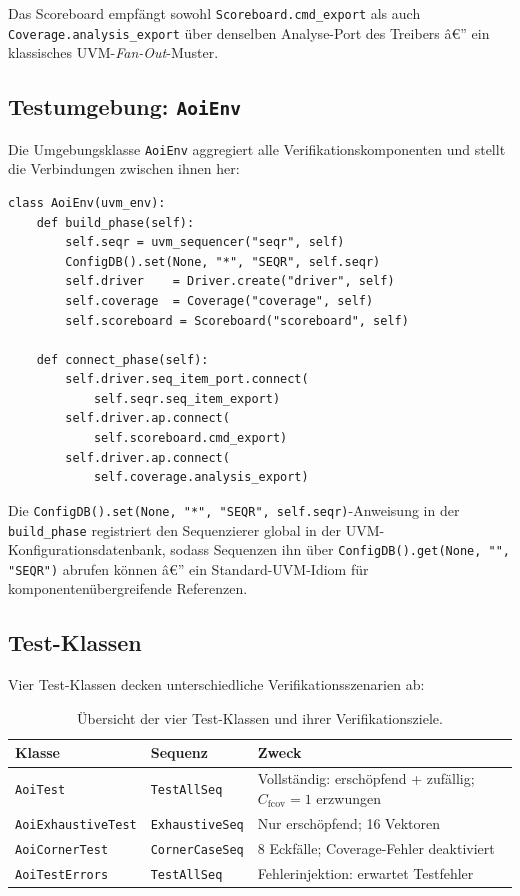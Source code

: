 ﻿\documentclass[12pt,a4paper]{report}
\begin{document}
Das Scoreboard empfängt sowohl \texttt{Scoreboard.cmd\_export} als auch
\texttt{Coverage.analy\newline sis\_export} über denselben Analyse-Port des Treibers â€”
ein klassisches UVM-\emph{Fan-Out}-Muster.

\subsection{Testumgebung: \texttt{AoiEnv}}
\label{sssec:aoi_env}

Die Umgebungsklasse \texttt{AoiEnv} aggregiert alle Verifikationskomponenten
und stellt die Verbindungen zwischen ihnen her:

\begin{lstlisting}[style=pythonstyle, caption={\texttt{AoiEnv}: Aufbau und Vernetzung}]
class AoiEnv(uvm_env):
    def build_phase(self):
        self.seqr = uvm_sequencer("seqr", self)
        ConfigDB().set(None, "*", "SEQR", self.seqr)
        self.driver    = Driver.create("driver", self)
        self.coverage  = Coverage("coverage", self)
        self.scoreboard = Scoreboard("scoreboard", self)

    def connect_phase(self):
        self.driver.seq_item_port.connect(
            self.seqr.seq_item_export)
        self.driver.ap.connect(
            self.scoreboard.cmd_export)
        self.driver.ap.connect(
            self.coverage.analysis_export)
\end{lstlisting}

Die \texttt{ConfigDB().set(None, "*", "SEQR", self.seqr)}-Anweisung in der
\texttt{build\_phase} registriert den Sequenzierer global in der
UVM-Konfigurationsdatenbank, sodass Sequenzen ihn über
\texttt{ConfigDB().get(None, "", "SEQR")} abrufen können â€” ein Standard-UVM-Idiom für
komponentenübergreifende Referenzen.

\subsection{Test-Klassen}
\label{sssec:test_klassen}

Vier Test-Klassen decken unterschiedliche Verifikationsszenarien ab:

\begin{table}[H]
\centering
\begin{tabular}{|l|l|p{4.5cm}|}
\hline
\textbf{Klasse} & \textbf{Sequenz} & \textbf{Zweck} \\
\hline
\texttt{AoiTest} & \texttt{TestAllSeq} & Vollständig: erschöpfend + zufällig; $C_{\mathrm{fcov}}=1$ erzwungen \\
\texttt{AoiExhaustiveTest} & \texttt{ExhaustiveSeq} & Nur erschöpfend; 16 Vektoren \\
\texttt{AoiCornerTest} & \texttt{CornerCaseSeq} & 8 Eckfälle; Coverage-Fehler deaktiviert \\
\texttt{AoiTestErrors} & \texttt{TestAllSeq} & Fehlerinjektion: erwartet Testfehler \\
\hline
\end{tabular}
\caption{Übersicht der vier Test-Klassen und ihrer Verifikationsziele.}
\label{tab:test_klassen}
\end{table}
\end{document}
